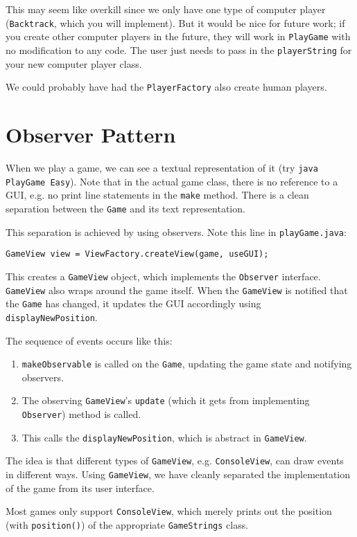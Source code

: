 \documentclass{article}
\begin{document}
This may seem like overkill since we only have one type of computer player (\texttt{Backtrack}, which you will implement).  But it would be nice for future work; if you create other computer players in the future, they will work in \texttt{PlayGame} with no modification to any code.  The user just needs to pass in the \texttt{playerString} for your new computer player class.

We could probably have had the \texttt{PlayerFactory} also create human players.

\section{Observer Pattern}
When we play a game, we can see a textual representation of it (try \texttt{java PlayGame Easy}).  Note that in the actual game class, there is no reference to a GUI, e.g. no print line statements in the \texttt{make} method.  There is a clean separation between the \texttt{Game} and its text representation.

This separation is achieved by using observers.  Note this line in \texttt{playGame.java}:
\begin{verbatim}
GameView view = ViewFactory.createView(game, useGUI);
\end{verbatim}
This creates a \texttt{GameView} object, which implements the \texttt{Observer} interface.  \texttt{GameView} also wraps around the game itself.  When the \texttt{GameView} is notified that the \texttt{Game} has changed, it updates the 
GUI accordingly using \texttt{displayNewPosition}.

The sequence of events occurs like this:
\begin{enumerate}
\item \texttt{makeObservable} is called on the \texttt{Game}, updating the game state and notifying observers.
\item The observing \texttt{GameView}'s \texttt{update} (which it gets from implementing \texttt{Observer}) method is called.
\item This calls the \texttt{displayNewPosition}, which is abstract in \texttt{GameView}.
\end{enumerate}
The idea is that different types of \texttt{GameView}, e.g. \texttt{ConsoleView}, can draw events in different ways.  Using \texttt{GameView}, we have cleanly separated the implementation of the game from its user interface.

Most games only support \texttt{ConsoleView}, which merely prints out the position (with \texttt{position()}) of the appropriate \texttt{GameStrings} class.
\end{document}
